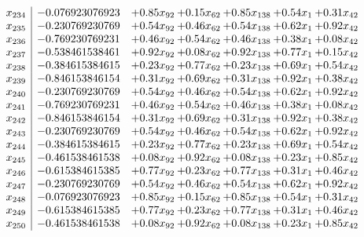 \documentclass[8pt]{article}
\begin{document}
\[\begin{array}{c| c c@{\hskip 2pt} c@{\hskip 2pt} c@{\hskip 2pt} c@{\hskip 2pt} c@{\hskip 2pt} }
 x_{234}   &  -0.076923076923 & +  0.85 x_{92} & +  0.15 x_{62} & +  0.85 x_{138} & +  0.54 x_{1} & +  0.31 x_{42}\\
 x_{235}   &  -0.230769230769 & +  0.54 x_{92} & +  0.46 x_{62} & +  0.54 x_{138} & +  0.62 x_{1} & +  0.92 x_{42}\\
 x_{236}   &  -0.769230769231 & +  0.46 x_{92} & +  0.54 x_{62} & +  0.46 x_{138} & +  0.38 x_{1} & +  0.08 x_{42}\\
 x_{237}   &  -0.538461538461 & +  0.92 x_{92} & +  0.08 x_{62} & +  0.92 x_{138} & +  0.77 x_{1} & +  0.15 x_{42}\\
 x_{238}   &  -0.384615384615 & +  0.23 x_{92} & +  0.77 x_{62} & +  0.23 x_{138} & +  0.69 x_{1} & +  0.54 x_{42}\\
 x_{239}   &  -0.846153846154 & +  0.31 x_{92} & +  0.69 x_{62} & +  0.31 x_{138} & +  0.92 x_{1} & +  0.38 x_{42}\\
 x_{240}   &  -0.230769230769 & +  0.54 x_{92} & +  0.46 x_{62} & +  0.54 x_{138} & +  0.62 x_{1} & +  0.92 x_{42}\\
 x_{241}   &  -0.769230769231 & +  0.46 x_{92} & +  0.54 x_{62} & +  0.46 x_{138} & +  0.38 x_{1} & +  0.08 x_{42}\\
 x_{242}   &  -0.846153846154 & +  0.31 x_{92} & +  0.69 x_{62} & +  0.31 x_{138} & +  0.92 x_{1} & +  0.38 x_{42}\\
 x_{243}   &  -0.230769230769 & +  0.54 x_{92} & +  0.46 x_{62} & +  0.54 x_{138} & +  0.62 x_{1} & +  0.92 x_{42}\\
 x_{244}   &  -0.384615384615 & +  0.23 x_{92} & +  0.77 x_{62} & +  0.23 x_{138} & +  0.69 x_{1} & +  0.54 x_{42}\\
 x_{245}   &  -0.461538461538 & +  0.08 x_{92} & +  0.92 x_{62} & +  0.08 x_{138} & +  0.23 x_{1} & +  0.85 x_{42}\\
 x_{246}   &  -0.615384615385 & +  0.77 x_{92} & +  0.23 x_{62} & +  0.77 x_{138} & +  0.31 x_{1} & +  0.46 x_{42}\\
 x_{247}   &  -0.230769230769 & +  0.54 x_{92} & +  0.46 x_{62} & +  0.54 x_{138} & +  0.62 x_{1} & +  0.92 x_{42}\\
 x_{248}   &  -0.076923076923 & +  0.85 x_{92} & +  0.15 x_{62} & +  0.85 x_{138} & +  0.54 x_{1} & +  0.31 x_{42}\\
 x_{249}   &  -0.615384615385 & +  0.77 x_{92} & +  0.23 x_{62} & +  0.77 x_{138} & +  0.31 x_{1} & +  0.46 x_{42}\\
 x_{250}   &  -0.461538461538 & +  0.08 x_{92} & +  0.92 x_{62} & +  0.08 x_{138} & +  0.23 x_{1} & +  0.85 x_{42}\\

\end{array}\]
\end{document}
